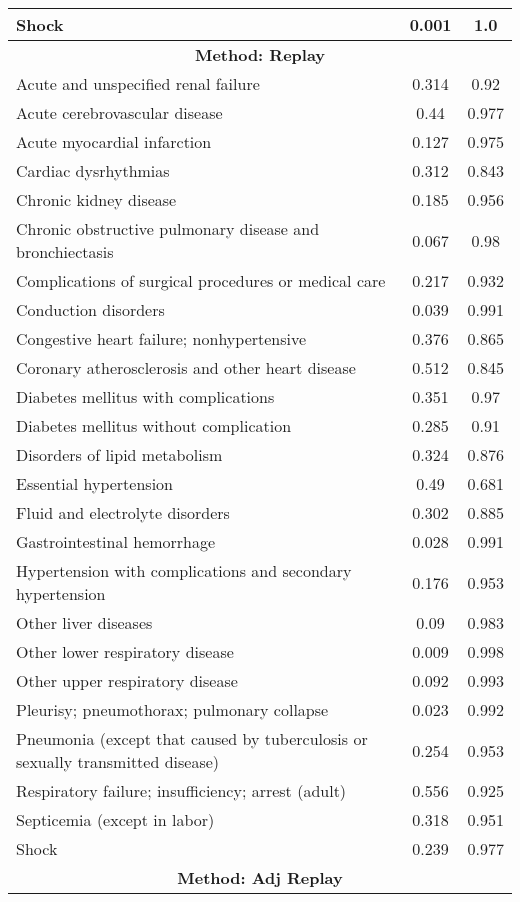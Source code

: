 \documentclass{article}
\begin{document}
\begin{longtable}{lcc}
Shock & 0.001 & 1.0 \\
\midrule
\multicolumn{3}{c}{\textbf{Method: Replay}} \\
\midrule
Acute and unspecified renal failure & 0.314 & 0.92 \\
Acute cerebrovascular disease & 0.44 & 0.977 \\
Acute myocardial infarction & 0.127 & 0.975 \\
Cardiac dysrhythmias & 0.312 & 0.843 \\
Chronic kidney disease & 0.185 & 0.956 \\
Chronic obstructive pulmonary disease and bronchiectasis & 0.067 & 0.98 \\
Complications of surgical procedures or medical care & 0.217 & 0.932 \\
Conduction disorders & 0.039 & 0.991 \\
Congestive heart failure; nonhypertensive & 0.376 & 0.865 \\
Coronary atherosclerosis and other heart disease & 0.512 & 0.845 \\
Diabetes mellitus with complications & 0.351 & 0.97 \\
Diabetes mellitus without complication & 0.285 & 0.91 \\
Disorders of lipid metabolism & 0.324 & 0.876 \\
Essential hypertension & 0.49 & 0.681 \\
Fluid and electrolyte disorders & 0.302 & 0.885 \\
Gastrointestinal hemorrhage & 0.028 & 0.991 \\
Hypertension with complications and secondary hypertension & 0.176 & 0.953 \\
Other liver diseases & 0.09 & 0.983 \\
Other lower respiratory disease & 0.009 & 0.998 \\
Other upper respiratory disease & 0.092 & 0.993 \\
Pleurisy; pneumothorax; pulmonary collapse & 0.023 & 0.992 \\
Pneumonia (except that caused by tuberculosis or sexually transmitted disease) & 0.254 & 0.953 \\
Respiratory failure; insufficiency; arrest (adult) & 0.556 & 0.925 \\
Septicemia (except in labor) & 0.318 & 0.951 \\
Shock & 0.239 & 0.977 \\
\midrule
\multicolumn{3}{c}{\textbf{Method: Adj Replay}} \\

\end{longtable}
\end{document}
